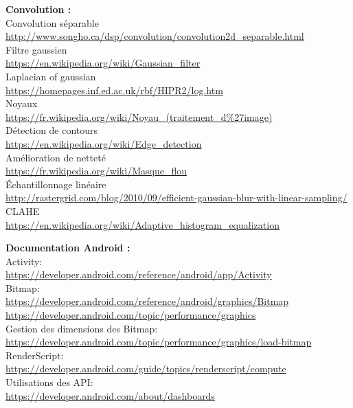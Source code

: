 \documentclass[12pt, a4paper]{article}
\begin{document}
  \textbf{Convolution :}
  \\
  Convolution séparable \label{separable_source}
  \\
  \url{http://www.songho.ca/dsp/convolution/convolution2d_separable.html}
  \\
  Filtre gaussien \label{gauss_source}
  \\
  \url{https://en.wikipedia.org/wiki/Gaussian_filter}
  \\
  Laplacian of gaussian \label{LoG}
  \\
  \url{https://homepages.inf.ed.ac.uk/rbf/HIPR2/log.htm}
  \\
  Noyaux \label{kernel_source}
  \\
  \url{https://fr.wikipedia.org/wiki/Noyau_(traitement_d%27image)}
  \\
  Détection de contours \label{edge_source}
  \\
  \url{https://en.wikipedia.org/wiki/Edge_detection}
  \\
  Amélioration de netteté \label{sharpen_source}
  \\
  \url{https://fr.wikipedia.org/wiki/Masque_flou}
  \\
  Échantillonnage linéaire \label{linear_sampling}
  \\
  \url{http://rastergrid.com/blog/2010/09/efficient-gaussian-blur-with-linear-sampling/}
  \\
  CLAHE \label{sharpen_source}
  \\
  \url{https://en.wikipedia.org/wiki/Adaptive_histogram_equalization}
  \\
  \newline
  \newline

  \textbf{Documentation Android :}
  \\
  Activity:
  \\
  \url{https://developer.android.com/reference/android/app/Activity}
  \\
  Bitmap:
  \\
  \url{https://developer.android.com/reference/android/graphics/Bitmap}
  \url{https://developer.android.com/topic/performance/graphics}
  \\
  Gestion des dimensions des Bitmap:
  \\
  \url{https://developer.android.com/topic/performance/graphics/load-bitmap}
  \\
  RenderScript:
  \\
  \url{https://developer.android.com/guide/topics/renderscript/compute}
  \\
  Utilisations des API:
  \\
  \url{https://developer.android.com/about/dashboards}
  \\
\end{document}

